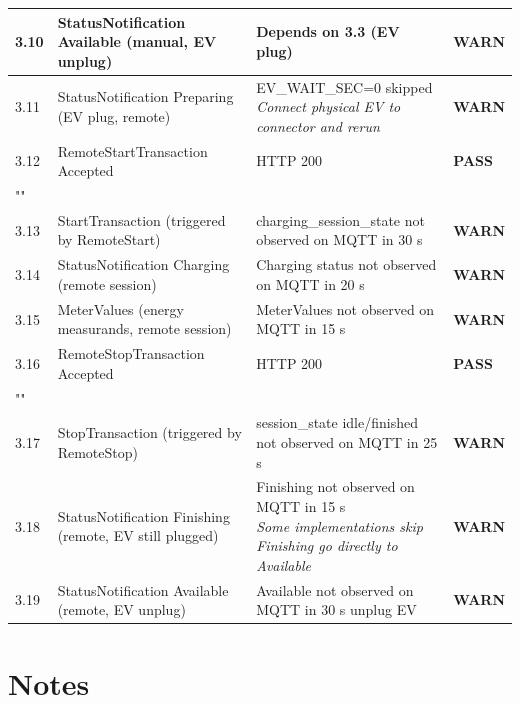 \documentclass[10pt, a4paper]{article}
\begin{document}
\begin{longtable}{|L{1cm}|L{5.5cm}|M{7cm}|C{1.8cm}|}
\hline
\small 3.10 & \small StatusNotification Available (manual, EV unplug) & Depends on 3.3 (EV plug) & \textcolor{warnorange}{\textbf{WARN}} \\
\hline
\small 3.11 & \small StatusNotification Preparing (EV plug, remote) & EV\_WAIT\_SEC=0  skipped{\newline\normalfont\footnotesize\itshape Connect physical EV to connector and rerun} & \textcolor{warnorange}{\textbf{WARN}} \\
\hline
\small 3.12 & \small RemoteStartTransaction  Accepted & HTTP 200 & \textcolor{passgreen}{\textbf{PASS}} \\
\hline
{} \\
\hline
\small 3.13 & \small StartTransaction (triggered by RemoteStart) & charging\_session\_state not observed on MQTT in 30 s & \textcolor{warnorange}{\textbf{WARN}} \\
\hline
\small 3.14 & \small StatusNotification Charging (remote session) & Charging status not observed on MQTT in 20 s & \textcolor{warnorange}{\textbf{WARN}} \\
\hline
\small 3.15 & \small MeterValues (energy measurands, remote session) & MeterValues not observed on MQTT in 15 s & \textcolor{warnorange}{\textbf{WARN}} \\
\hline
\small 3.16 & \small RemoteStopTransaction  Accepted & HTTP 200 & \textcolor{passgreen}{\textbf{PASS}} \\
\hline
{} \\
\hline
\small 3.17 & \small StopTransaction (triggered by RemoteStop) & session\_state idle/finished not observed on MQTT in 25 s & \textcolor{warnorange}{\textbf{WARN}} \\
\hline
\small 3.18 & \small StatusNotification Finishing (remote, EV still plugged) & Finishing not observed on MQTT in 15 s{\newline\normalfont\footnotesize\itshape Some implementations skip Finishing  go directly to Available} & \textcolor{warnorange}{\textbf{WARN}} \\
\hline
\small 3.19 & \small StatusNotification Available (remote, EV unplug) & Available not observed on MQTT in 30 s  unplug EV & \textcolor{warnorange}{\textbf{WARN}} \\
\hline
\end{longtable}
\normalsize

\section{Notes}
\end{document}
